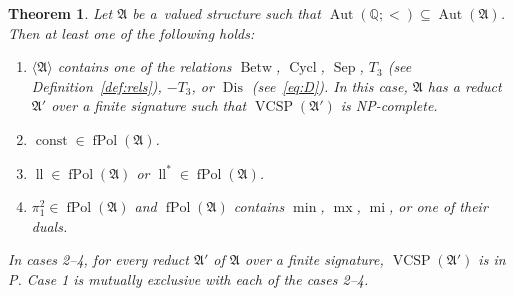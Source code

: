 \documentclass[preprint,12pt]{elsarticle}
\newcommand{\Q}{\mathbb Q}
\newcommand{\bA}{{\mathfrak A}}
\newcommand{\checked}[1]{#1}
\DeclareMathOperator{\Cyc}{Cycl}
\DeclareMathOperator{\Aut}{Aut}
\DeclareMathOperator{\fPol}{fPol}
\DeclareMathOperator{\VCSP}{VCSP}
\DeclareMathOperator{\Pol}{Pol}
\DeclareMathOperator{\mi}{mi}
\DeclareMathOperator{\lele}{ll}
\DeclareMathOperator{\mx}{mx}
\DeclareMathOperator{\lex}{lex}
\DeclareMathOperator{\const}{const}
\DeclareMathOperator{\Betw}{Betw}
\DeclareMathOperator{\Sep}{Sep}
\DeclareMathOperator{\Dis}{Dis}
\newtheorem{theorem}{Theorem}
\begin{document}
\begin{theorem}\label{thm:tvcsp-clas}
Let $\bA$ be a~valued structure
such that $\Aut(\Q; <) \subseteq \Aut(\bA)$. Then at least one of the following holds:
\begin{enumerate}
    \item $\langle \bA \rangle$ contains one of the relations $\Betw$, $\Cyc$, $\Sep$, $T_3$ (see Definition~\ref{def:rels}), $-T_3$, or $\Dis$ (see~\eqref{eq:D}). In this case, $\bA$ has  a reduct $\bA'$ over a finite signature such that $\VCSP(\bA')$ is NP-complete.
    \item $\const \in \fPol(\bA)$.
    \item \checked{$\lele \in \fPol(\bA)$ or $\lele^* \in \fPol(\bA)$.}
    \item $\pi_1^2 \in \fPol(\bA)$ and $\fPol(\bA)$ contains \checked{$\min$, $\mx$, $\mi$}, or one of their duals.
\end{enumerate}
In cases 2--4, for every reduct $\bA'$ of $\bA$ over a finite signature, $\VCSP(\bA')$ is in P.
%
\checked{Case 1 is mutually exclusive with each of the cases 2--4.}
\end{theorem}
\end{document}
